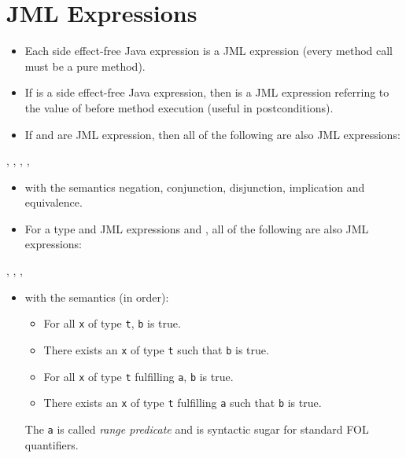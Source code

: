 	\section{JML Expressions}
		\begin{itemize}
			\item Each side effect-free Java expression is a JML expression (every method call must be a pure method).
			\item If  is a side effect-free Java expression, then  is a JML expression referring to the value of  before method execution (useful in postconditions).
			\item If  and  are  JML expression, then all of the following are also  JML expressions:
		\end{itemize}
		\begin{center}
			, \quad {}, \quad {}, \quad {}, \quad {}
		\end{center}
		\begin{itemize}
			\item[] with the semantics negation, conjunction, disjunction, implication and equivalence.
			\item For a type  and  JML expressions  and , all of the following are also  JML expressions:
		\end{itemize}
		\begin{center}
			, \quad {}, \quad {}, \quad {}
		\end{center}
		\begin{itemize}
			\item[] with the semantics (in order):
				\begin{itemize}
					\item For all \texttt{x} of type \texttt{t}, \texttt{b} is true.
					\item There exists an \texttt{x} of type \texttt{t} such that \texttt{b} is true.
					\item For all \texttt{x} of type \texttt{t} fulfilling \texttt{a}, \texttt{b} is true.
					\item There exists an \texttt{x} of type \texttt{t} fulfilling \texttt{a} such that \texttt{b} is true.
				\end{itemize}
				The  \texttt{a} is called \textit{range predicate} and is syntactic sugar for standard FOL quantifiers.
		\end{itemize}

